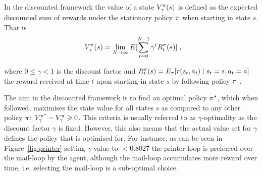 \documentclass[envcountsame]{llncs}
\newcommand\MS[2][r]{\ifx t#1 \textcolor{blue}{[\textbf{MS:} #2]}
  \else \begin{center}\textcolor{blue}{\textbf{MS:} #2} \end{center} \fi}
\begin{document}
In the discounted framework the value of a state \(V_{\gamma}^{\pi}(s)\) is defined as the expected
discounted sum of rewards under the stationary policy \(\pi\) when starting in state \(s\). That is
\begin{align*}
  V_{\gamma}^{\pol}(s)=\lim_{N \to \infty} E[\sum_{t=0}^{N-1} \gamma^{t} R_{t}^{\pol}(s)]\tcom
\end{align*}

where \(0 \leqslant \gamma < 1\) is the discount factor and
\(R_{t}^{\pi}(s) = E_{\pi}[ r(s_{t},a_{t}) \mid s_{t} = s, a_{t} = a]\) %
the reward received at time \(t\) upon starting in state \(s\) by following policy \(\pi\)
\citep{Mahadevan96_AverageRewardReinforcementLearningFoundationsAlgorithmsAndEmpiricalResults}.

The aim in the discounted framework is to find an optimal policy \(\pi^{\star}\), which when followed,
maximises the state value for all states \(s\) as compared to any other policy \(\pi\):
\(V_{\gamma}^{\pi^{\star}} - V_{\gamma}^{\pi} \geqslant 0\). This criteria is usually referred to as
\(\gamma\)-optimality as the discount factor \(\gamma\) is fixed. However, this also means that the
actual value set for \(\gamma\) defines the policy that is optimised for. For instance, as can be
seen in Figure~\ref{fig:printer} setting \(\gamma\) value to \(<0.8027\) the printer-loop is
preferred over the mail-loop by the agent, although the mail-loop accumulates more reward over time,
i.e. selecting the mail-loop is a sub-optimal choice.
\end{document}

